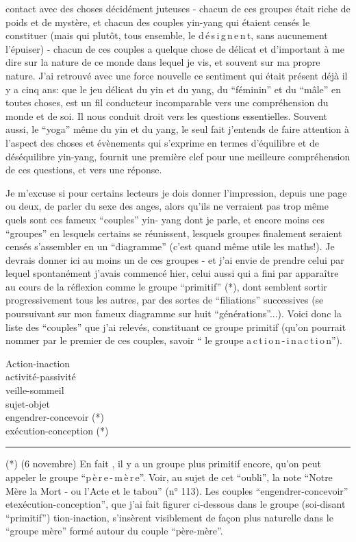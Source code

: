 contact avec des choses décidément juteuses - chacun de ces groupes était riche de poids et de mystère, et chacun des couples yin-yang qui étaient censés le constituer (mais qui plutôt, tous ensemble, le d\,é\,s\,i\,g\,n\,e\,n\,t, sans aucunement l'épuiser) - chacun de ces couples a quelque chose de délicat et d'important à me dire sur la nature de ce monde dans lequel je vis, et souvent sur ma propre nature. J'ai retrouvé avec une force nouvelle ce sentiment qui était présent déjà il y a cinq ans: que le jeu délicat du yin et du yang, du ``féminin'' et du ``mâle'' en toutes choses, est un fil conducteur incomparable vers une compréhension du monde et de soi. Il nous conduit droit vers les questions essentielles. Souvent aussi, le ``yoga'' même du yin et du yang, le seul fait\handwritten{,} j'entends\handwritten{,} de faire attention à l'aspect des choses et évènements qui s'exprime en termes d'équilibre et de déséquilibre yin-yang, fournit une première clef pour une meilleure compréhension de ces questions, et vers une réponse.

Je m'excuse si pour certains lecteurs je dois donner l'impression, depuis une page ou deux, de parler du sexe des anges, alors qu'ils ne verraient pas trop même quels sont ces fameux ``couples'' yin- yang dont je parle, et encore moins ces ``groupes'' en lesquels certains se réunissent, lesquels groupes finalement seraient censés s'assembler en un ``diagramme'' (c'est quand même utile les maths!). Je devrais donner ici au moins un de ces groupes - et j'ai envie de prendre celui par lequel spontanément j'avais commencé hier, celui aussi qui a fini par apparaître au cours de la réflexion comme le groupe ``primitif'' (*), dont semblent sortir progressivement tous les autres, par des sortes de ``filiations'' successives (se poursuivant sur mon fameux diagramme sur huit ``générations''...). Voici donc la liste des ``couples'' que j'ai relevés, constituant ce groupe primitif (qu'on pourrait nommer par le premier de ces couples, savoir `` le groupe a\,c\,t\,i\,o\,n\handwritten{\unsure{$\checkmark$|,}}\,-\,i\,n\,a\,c\,t\,i\,o\,n'').

\begin{flushleft}
Action-inaction\\
activité-passivité\\
veille-sommeil\\
sujet-objet\\
engendrer-concevoir (*)\\
exécution-conception (*)
\end{flushleft}

\noindent\rule{3cm}{.35pt}

{\small (*) (6 novembre) En fait , il y a un groupe plus primitif encore, qu'on peut appeler le groupe ``p\,è\,r\,e\,-\,m\,è\,r\,e''. Voir, au sujet de cet ``oubli'', la note ``Notre Mère la Mort - ou l'Acte et le tabou'' (n° 113). Les couples ``engendrer-concevoir'' etexécution-conception'', que j'ai fait figurer ci-dessous dans le groupe (soi-disant ``primitif'') tion-inaction, s'insèrent visiblement de façon plus naturelle dans le ``groupe mère'' formé autour du couple ``père-mère''.}
